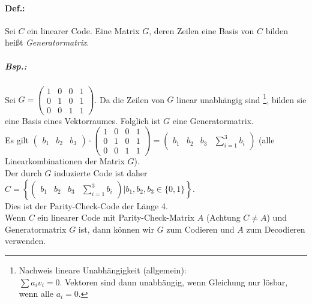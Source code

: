 \paragraph{Def.:} Sei $C$ ein linearer Code. Eine Matrix $G$, deren Zeilen eine Basis von $C$ bilden heißt \emph{Generatormatrix}.

\subparagraph{Bsp.:} Sei $G=\begin{pmatrix}
1 & 0 & 0 & 1\\
0 & 1 & 0 & 1 \\
0 & 0 & 1 & 1
\end{pmatrix}$. Da die Zeilen von $G$ linear unabhängig sind \footnote{Nachweis lineare Unabhängigkeit (allgemein): \\
$\sum a_i v_i=0$. Vektoren sind dann unabhängig, wenn Gleichung nur lösbar, wenn alle $a_i=0$.}, bilden  sie eine Basis eines Vektorraumes. Folglich ist $G$ eine Generatormatrix.\\
Es gilt $\begin{pmatrix}
b_1 & b_2 & b_3
\end{pmatrix}\cdot \begin{pmatrix}
1 & 0 & 0 & 1\\
0 & 1 & 0 & 1 \\
0 & 0 & 1 & 1
\end{pmatrix}= \begin{pmatrix}
b_1 & b_2 & b_3 & \sum_{i=1}^3 b_i
\end{pmatrix}$ (alle Linearkombinationen der Matrix $G$). \\
Der durch $G$ induzierte Code ist daher $C=\left\lbrace\begin{pmatrix}
b_1 & b_2 & b_3 & \sum_{i=1}^3 b_i
\end{pmatrix}|b_1,b_2,b_3 \in \{0,1\}\right\rbrace$. \\
Dies ist der Parity-Check-Code der Länge 4.\bigskip\\
Wenn $C$ ein linearer Code mit Parity-Check-Matrix $A$ (Achtung $C\not = A$) und Generatormatrix $G$ ist, dann können wir $G$ zum Codieren und $A$ zum Decodieren verwenden.

